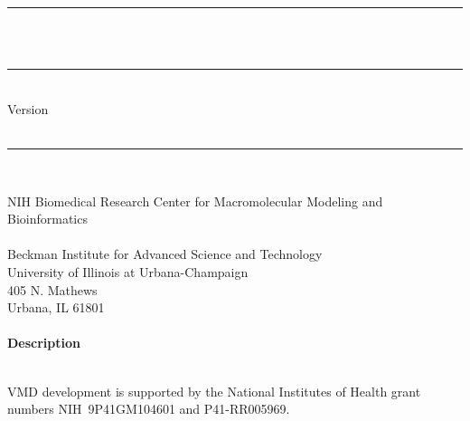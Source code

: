 \begin{center}
  \rule{6in}{0.04in}				\\	\vspace{0.25in}
  {\Huge \VMD\ \DOCTITLE}			\\	\vspace{0.25in}
  \rule{6in}{0.04in}				\\	\vspace{0.25in}
  {\Large Version \VMDVER}			\\	\vspace{0.20in}
  \VMDDATE					\\	\vspace{0.20in}
  \rule{6in}{0.04in}				\\	\vspace{0.25in}


  {\Large NIH Biomedical Research Center for Macromolecular Modeling and Bioinformatics} \\	\vspace{0.20in}
  {\large       {}           \\
                Beckman Institute for Advanced Science and Technology  \\
                University of Illinois at Urbana-Champaign             \\
                405 N. Mathews                                         \\
                Urbana, IL  61801                                      \\
		\vspace{0.1in}  \\
  }
  \vspace{0.5in}
  {\Large \bf Description}
  \vspace{0.1in}
\end{center}

{\DOCDESC}
\vspace{0.1in} \\
VMD development is supported by the National Institutes of Health
grant numbers NIH~9P41GM104601 and P41-RR005969.
